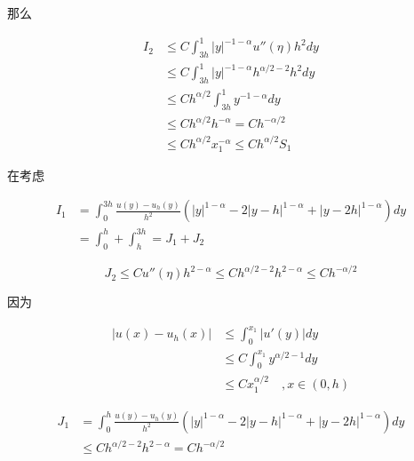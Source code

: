 \documentclass{ctexart}
\begin{document}
那么

\begin{equation}
    \begin{aligned}
            I_2 &\le  C \int_{3h}^{1} |y|^{-1-\alpha} u''(\eta) h^2 dy   \\
            & \le  C \int_{3h}^{1} |y|^{-1-\alpha} h^{\alpha/2-2} h^2 dy    \\
            & \le C h^{\alpha/2}  \int_{3h}^{1} y^{-1-\alpha} dy  \\
            & \le C h^{\alpha/2} h^{-\alpha} = C h^{-\alpha/2}   \\
            & \le C h^{\alpha/2} x_1^{-\alpha} \le C h^{\alpha/2} S_1
    \end{aligned}
\end{equation}

在考虑

\begin{equation}
    \begin{aligned}
        I_1 &= \int_0^{3h}  \frac{ u(y) - u_h(y) }{h^2} (|y|^{1-\alpha} - 2|y-h|^{1-\alpha} + |y-2h|^{1-\alpha}) dy \\
        &= \int_0^h + \int_h^{3h} = J_1 + J_2
    \end{aligned}
\end{equation}

\begin{equation}
    J_2 \le C u''(\eta) h^{2-\alpha} \le C h^{\alpha/2-2} h^{2-\alpha} \le C h^{-\alpha/2}
\end{equation}

因为

\begin{equation}
    \begin{aligned}
        |u(x) - u_h(x)| &\le \int_0^{x_1} |u'(y)| dy    \\
        &\le C \int_0^{x_1} y^{\alpha/2-1} dy   \\
        &\le C x_1^{\alpha/2}    \quad , x\in (0, h)
    \end{aligned}
\end{equation}


\begin{equation}
    \begin{aligned}
        J_1 & = \int_0^h \frac{ u(y) - u_h(y) }{h^2} (|y|^{1-\alpha} - 2|y-h|^{1-\alpha} + |y-2h|^{1-\alpha}) dy \\
        &\le C h^{\alpha/2-2} h^{2-\alpha} = C h^{-\alpha/2}
    \end{aligned}
\end{equation}
\end{document}
